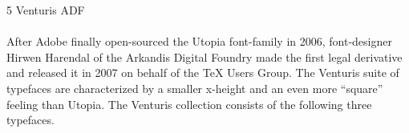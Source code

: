 \documentclass{article}
\begin{document}
\frenchspacing

\noindent
{\LARGE 5 Venturis ADF}\\
~\\
After Adobe finally open-sourced the Utopia font-family in 2006,
font-designer Hirwen Harendal of the Arkandis Digital Foundry made the first
legal derivative and released it in 2007 on behalf of the \TeX{} Users
Group.  The Venturis suite of typefaces are characterized by a smaller
x-height and an even more ``square'' feeling than Utopia.  The Venturis
collection consists of the following three typefaces.

\end{document}
